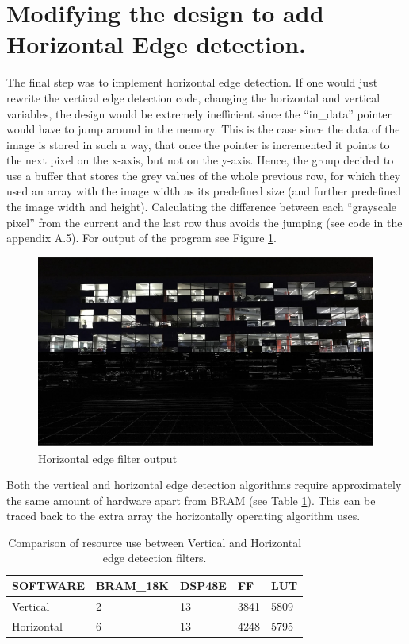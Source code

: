 \section{Modifying the design to add Horizontal Edge detection.}

The final step was to implement horizontal edge detection. If one would just rewrite the vertical edge detection code, changing the horizontal and vertical variables, the design would be extremely inefficient since the “in\_data” pointer would have to jump around in the memory. This is the case since the data of the image is stored in such a way, that once the pointer is incremented it points to the next pixel on the x-axis, but not on the y-axis. Hence, the group decided to use a buffer that stores the grey values of the whole previous row, for which they used an array with the image width as its predefined size (and further predefined the image width and height). Calculating the difference between each “grayscale pixel” from the current and the last row thus avoids the jumping (see code in the appendix A.5). For output of the program see Figure \ref{horizontaledge}.


\begin{figure}[H]
\centering
\includegraphics[scale=0.8]{horizontaledge}
\caption{Horizontal edge filter output}
\label{horizontaledge}
\end{figure}

Both the vertical and horizontal edge detection algorithms require approximately the same amount of hardware apart from BRAM (see Table \ref{ResourceUseEdge}). This can be traced back to the extra array the horizontally operating algorithm uses.

\begin{table}[H]
\centering
\begin{tabular}{ |p{3cm}||p{2cm}|p{2cm}|p{2cm}|p{2cm}|}
 \hline
 SOFTWARE & BRAM\_18K & DSP48E & FF & LUT\\
 \hline
 \hline
 Vertical   & 2 & 13 &  3841 & 5809\\
 Horizontal & 6 & 13 & 4248 & 5795 \\
 \hline
\end{tabular}
\caption{Comparison of resource use between Vertical and Horizontal edge detection filters.}
\label{ResourceUseEdge}
\end{table}





